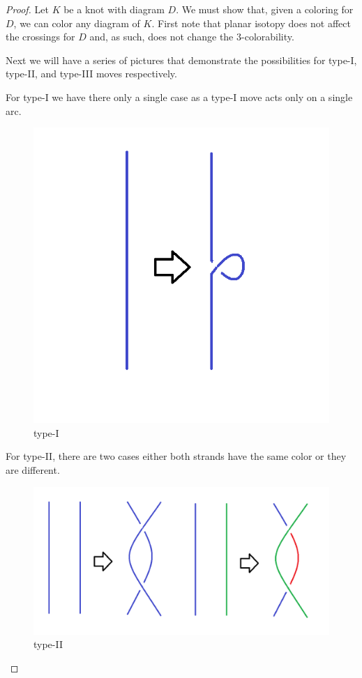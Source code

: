 \documentclass[12pt]{amsart}
\theoremstyle{definition}
\theoremstyle{remark}
\numberwithin{equation}{section}
\newcommand{\ds}{.3}
\begin{document}
\begin{proof}
  Let $K$ be a knot with diagram $D$. We must show that, given a coloring
  for $D$, we can color any diagram of $K$. First note that planar isotopy
  does not affect the crossings for $D$ and, as such, does not change the
  $3$-colorability.

  Next we will have a series of pictures that demonstrate the possibilities
  for type-I, type-II, and type-III moves respectively.

  For type-I we have there only a single case as a type-I move acts only on
  a single arc.
  \begin{figure}
    \includegraphics[scale=\ds]{t1-c}
    \caption{type-I}
    \label{fig:t1-c}
  \end{figure}
  
  For type-II, there are two cases either both strands have the same color
  or they are different.
  \begin{figure}
    \includegraphics[scale=\ds]{t2-c}
    \caption{type-II}
    \label{fig:t2-c}
  \end{figure}


\end{proof}
\end{document}
